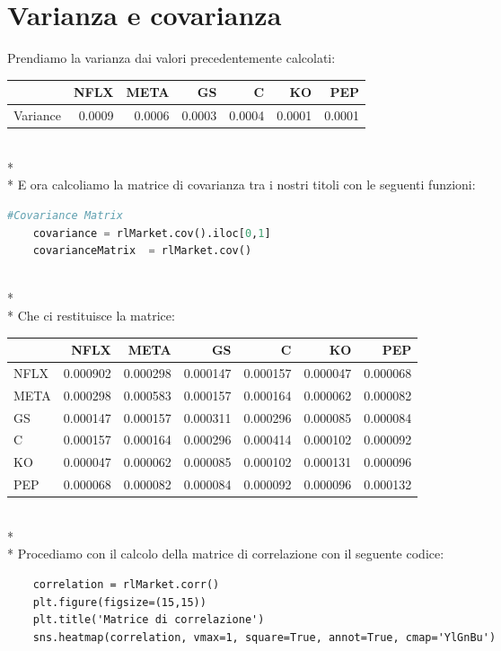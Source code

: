 \documentclass{report}
\begin{document}
\section{Varianza e covarianza}
Prendiamo la varianza dai valori precedentemente calcolati:

\begin{tabular}{lrrrrrr}
\toprule
{} &    NFLX &    META &      GS &       C &      KO &     PEP \\
\midrule
Variance &  0.0009 &  0.0006 &  0.0003 &  0.0004 &  0.0001 &  0.0001 \\
\bottomrule
\end{tabular}
\\*
\\*
E ora calcoliamo la matrice di covarianza tra i nostri titoli con le seguenti funzioni:
\begin{lstlisting}[language=python]
    #Covariance Matrix
    covariance = rlMarket.cov().iloc[0,1]
    covarianceMatrix  = rlMarket.cov()
\end{lstlisting}
\\*
\\*
Che ci restituisce la matrice:

\begin{tabular}{lrrrrrr}
\toprule
{} &      NFLX &      META &        GS &         C &        KO &       PEP \\
\midrule
NFLX &  0.000902 &  0.000298 &  0.000147 &  0.000157 &  0.000047 &  0.000068 \\
META &  0.000298 &  0.000583 &  0.000157 &  0.000164 &  0.000062 &  0.000082 \\
GS   &  0.000147 &  0.000157 &  0.000311 &  0.000296 &  0.000085 &  0.000084 \\
C    &  0.000157 &  0.000164 &  0.000296 &  0.000414 &  0.000102 &  0.000092 \\
KO   &  0.000047 &  0.000062 &  0.000085 &  0.000102 &  0.000131 &  0.000096 \\
PEP  &  0.000068 &  0.000082 &  0.000084 &  0.000092 &  0.000096 &  0.000132 \\
\bottomrule
\end{tabular}
\\*
\\*
Procediamo con il calcolo della matrice di correlazione con il seguente codice:
\begin{lstlisting}
    correlation = rlMarket.corr()
    plt.figure(figsize=(15,15))
    plt.title('Matrice di correlazione')
    sns.heatmap(correlation, vmax=1, square=True, annot=True, cmap='YlGnBu')
\end{lstlisting}
\end{document}
